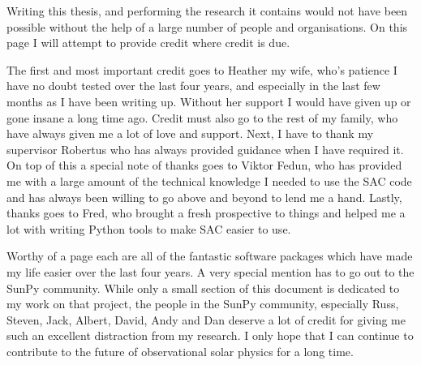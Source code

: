 
\begin{acknowledgements}      

Writing this thesis, and performing the research it contains would not have been possible without the help of a large number of people and organisations.
On this page I will attempt to provide credit where credit is due.

The first and most important credit goes to Heather my wife, who's patience I have no doubt tested over the last four years, and especially in the last few months as I have been writing up.
Without her support I would have given up or gone insane a long time ago.
Credit must also go to the rest of my family, who have always given me a lot of love and support.
Next, I have to thank my supervisor Robertus who has always provided guidance when I have required it.
On top of this a special note of thanks goes to Viktor Fedun, who has provided me with a large amount of the technical knowledge I needed to use the SAC code and has always been willing to go above and beyond to lend me a hand.
Lastly, thanks goes to Fred, who brought a fresh prospective to things and helped me a lot with writing Python tools to make SAC easier to use.

Worthy of a page each are all of the fantastic software packages which have made my life easier over the last four years.
A very special mention has to go out to the SunPy \citep{thesunpycommunity2015a} community.
While only a small section of this document is dedicated to my work on that project, the people in the SunPy community, especially Russ, Steven, Jack, Albert, David, Andy and Dan deserve a lot of credit for giving me such an excellent distraction from my research.
I only hope that I can continue to contribute to the future of observational solar physics for a long time.


\end{acknowledgements}
